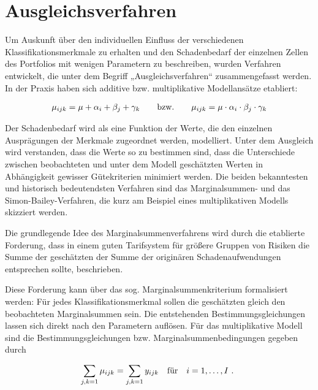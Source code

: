 \section{Ausgleichsverfahren} \label{Ausgleichsverfahren}%

Um Auskunft über den individuellen Einfluss der verschiedenen Klassifikationsmerkmale zu erhalten und den Schadenbedarf der einzelnen Zellen des Portfolios mit wenigen Parametern zu beschreiben, wurden Verfahren entwickelt, die unter dem Begriff „Ausgleichsverfahren“ zusammengefasst werden. In der Praxis haben sich additive bzw. multiplikative Modellansätze etabliert:

\begin{eqnarray}  \label{eq:1}
\mu_{ijk} = \mu + \alpha_i + \beta_j + \gamma_k    \qquad \textnormal{bzw.} \qquad  \mu_{ijk} = \mu \cdot \alpha_i \cdot \beta_j \cdot \gamma_k
\end{eqnarray}

Der Schadenbedarf wird als eine Funktion der Werte, die den einzelnen Ausprägungen der Merkmale zugeordnet werden, modelliert. Unter dem Ausgleich wird verstanden, dass die Werte so zu bestimmen sind, dass die Unterschiede zwischen beobachteten und unter dem Modell geschätzten Werten in Abhängigkeit gewisser Gütekriterien minimiert werden. Die beiden bekanntesten und historisch bedeutendsten Verfahren sind das Marginalsummen- und das Simon-Bailey-Verfahren, die kurz am Beispiel eines multiplikativen Modells skizziert werden.

Die grundlegende Idee des Marginalsummenverfahrens wird durch die etablierte Forderung, dass in einem guten Tarifsystem für größere Gruppen von Risiken die Summe der geschätzten der Summe der originären Schadenaufwendungen entsprechen sollte, beschrieben.

Diese Forderung kann über das sog. Marginalsummenkriterium formalisiert werden: Für jedes Klassifikationsmerkmal sollen die geschätzten gleich den beobachteten Marginalsummen sein. Die entstehenden Bestimmungsgleichungen lassen sich direkt nach den Parametern auflösen. Für das multiplikative Modell sind die Bestimmungsgleichungen bzw. Marginalsummenbedingungen gegeben durch

\begin{eqnarray}
 \sum_{j,k=1} \mu_{ijk} =  \sum_{j,k=1} y_{ijk}   \quad \textnormal{für} \quad  i=1,\ldots,I  \textnormal{ . }
\end{eqnarray}

